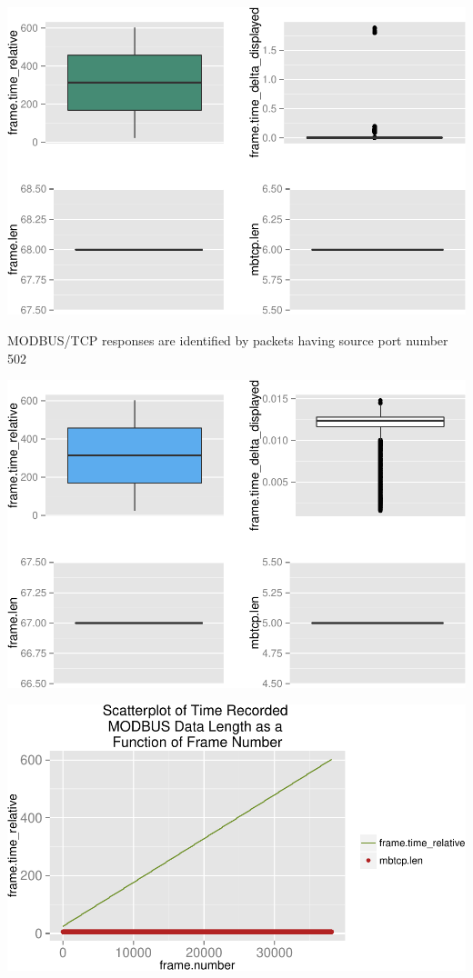 \documentclass[]{article}
\begin{document}
\begin{center}\includegraphics{modbus_files/figure-latex/unnamed-chunk-11-1} \end{center}

\pagebreak

MODBUS/TCP responses are identified by packets having source port number
502

\begin{center}\includegraphics{modbus_files/figure-latex/unnamed-chunk-13-1} \end{center}

\pagebreak

\includegraphics{modbus_files/figure-latex/unnamed-chunk-14-1.pdf}
\end{document}
